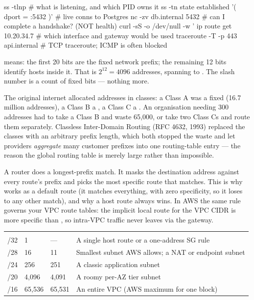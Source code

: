 \begin{bashbox}
ss -tlnp                       # what is listening, and which PID owns it
ss -tn state established '( dport = :5432 )'   # live conns to Postgres
nc -zv db.internal 5432        # can I complete a handshake? (NOT health)
curl -sS -o /dev/null -w '%
ip route get 10.20.34.7        # which interface and gateway would be used
traceroute -T -p 443 api.internal   # TCP traceroute; ICMP is often blocked
\end{bashbox}


  means: the first 20 bits are the fixed network prefix; the remaining 12 bits identify hosts inside it. That is $2^{12} = 4096$ addresses, spanning  to . The slash number is a count of fixed bits --- nothing more.

 The original internet allocated addresses in classes: a Class A was a fixed  (16.7 million addresses), a Class B a , a Class C a . An organisation needing 300 addresses had to take a Class B and waste 65{,}000, or take two Class Cs and route them separately. Classless Inter-Domain Routing (RFC 4632, 1993) replaced the classes with an arbitrary prefix length, which both stopped the waste and let providers \emph{aggregate} many customer prefixes into one routing-table entry --- the reason the global routing table is merely large rather than impossible.

 A router does a longest-prefix match. It masks the destination address against every route's prefix and picks the most specific route that matches. This is why  works as a default route (it matches everything, with zero specificity, so it loses to any other match), and why a  host route always wins. In AWS the same rule governs your VPC route tables: the implicit local route for the VPC CIDR is more specific than , so intra-VPC traffic never leaves via the gateway.

\begin{center}\small
\wbrowcolors
\begin{tabularx}{\linewidth}{@{}L{16mm} C{20mm} C{20mm} X@{}}
 &  &  & \\
/32 & 1 & --- & A single host route or a one-address SG rule\\
/28 & 16 & 11 & Smallest subnet AWS allows; a NAT or endpoint subnet\\
/24 & 256 & 251 & A classic application subnet\\
/20 & 4{,}096 & 4{,}091 & A roomy per-AZ tier subnet\\
/16 & 65{,}536 & 65{,}531 & An entire VPC (AWS maximum for one block)\\
\end{tabularx}
\end{center}


